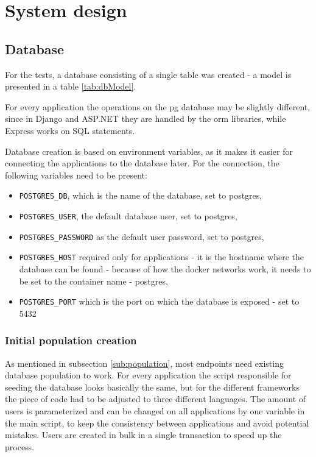 
\chapter{System design}

\section{Database}\label{sec:pgDbVars}

For the tests, a database consisting of a single table was created - a model is presented in a table \ref{tab:dbModel}.



For every application the operations on the \acrlong{pg} database may be slightly different, since in Django and ASP.NET they are handled by the \acrlong{orm} libraries, while Express works on SQL statements.

Database creation is based on environment variables, as it makes it easier for connecting the applications to the database later. For the connection, the following variables need to be present:
\begin{itemize}
    \item \lstinline{POSTGRES_DB}, which is the name of the database, set to postgres,
    \item \lstinline{POSTGRES_USER}, the default database user, set to postgres,
    \item \lstinline{POSTGRES_PASSWORD} as the default user password, set to postgres,
    \item \lstinline{POSTGRES_HOST} required only for applications - it is the hostname where the database can be found - because of how the docker networks work, it needs to be set to the container name - postgres,
    \item \lstinline{POSTGRES_PORT} which is the port on which the database is exposed - set to 5432
\end{itemize}

\subsection{Initial population creation}

As mentioned in subsection \ref{sub:population}, most endpoints need existing database population to work. For every application the script responsible for seeding the database looks basically the same, but for the different frameworks the piece of code had to be adjusted to three different languages. The amount of users is parameterized and can be changed on all applications by one variable in the main script, to keep the consistency between applications and avoid potential mistakes. Users are created in bulk in a single transaction to speed up the process.

